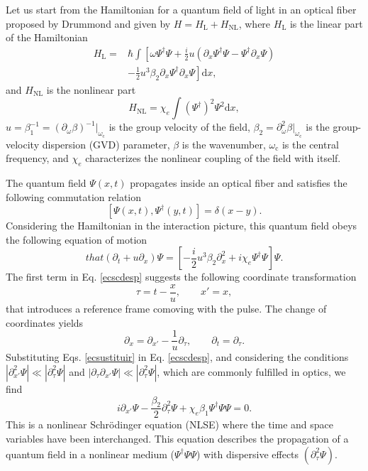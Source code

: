 \documentclass[aps,pra,reprint,amsmath,amssymb,showpacs,groupedaddress,floatfix]{revtex4-1}
\begin{document}
Let us start from the Hamiltonian for a quantum field of light in an optical fiber proposed by Drummond \cite{drummond1990,drummond2014quantum} and given by $H=H_\text{L}+H_\text{NL}$, where $H_\text{L}$ is the linear part of the Hamiltonian
\begin{align}
H_\text{L}=&\hbar \int  \left[\omega\Psi^{\dagger}\Psi
+\frac{i}{2}u\left(\partial_x\Psi^{\dagger}\Psi-\Psi^{\dagger}\partial_x\Psi\right)\right. \nonumber\\
&\left. -\frac{1}{2}u^3\beta_2\partial_x\Psi^{\dagger}\partial_x\Psi \right] \text{d}x,
\end{align}
and $H_\text{NL}$ is the nonlinear part
\begin{equation}
H_\text{NL}=\chi_e\int \left(\Psi^{\dagger}\right)^2\Psi^2 \text{d}x,
\end{equation}
$u=\beta_1^{-1}=(\partial_{\omega}\beta)^{-1}|_{\omega_\text{c}}$ is the group velocity of the field, $\beta_2=\partial^2_\omega \beta|_{\omega_\text{c}}$ is the group-velocity dispersion (GVD) parameter, $\beta$ is the wavenumber, $\omega_\text{c}$ is the central frequency, and $\chi_e$ characterizes the nonlinear coupling of the field with itself.

The quantum field $\Psi(x,t)$ propagates inside an optical fiber and satisfies the following commutation relation
\begin{equation}\label{ec:conmutador}
[\Psi(x,t),\Psi^{\dagger}(y,t)]=\delta(x-y).
\end{equation}
Considering the Hamiltonian in the interaction picture, this quantum field obeys the following equation of motion
\begin{equation}\label{ecscdesp}that
(\partial_t+u\partial_x)\Psi=\left[-\frac{i}{2}u^3\beta_2\partial_x^2+i\chi_e\Psi^{\dagger}\Psi\right]\Psi.
\end{equation} 
The first term in Eq. \eqref{ecscdesp} suggests the following coordinate transformation
\begin{equation}\label{trans1}
\tau=t-\frac{x}{u},\qquad x'=x,
\end{equation}
that introduces a reference frame comoving with the pulse. The change of coordinates yields
\begin{equation}\label{ecsustituir}
\partial_x=\partial_{x'}- \frac{1}{u}\partial_{\tau}, \qquad \partial_{t}=\partial_{\tau}.
\end{equation}
Substituting Eqs. \eqref{ecsustituir} in Eq. \eqref{ecscdesp}, and considering the conditions $|\partial_{x'}^2\Psi|\ll |\partial_{\tau}^2\Psi|$ and $|\partial_{\tau}\partial_{x'}\Psi|\ll |\partial_{\tau}^2\Psi|$, which are commonly fulfilled in optics\cite{drummond2014quantum}, we find
\begin{equation}\label{ec:NLST}
i\partial_{x'}\Psi-\frac{\beta_2}{2}\partial_{\tau}^2\Psi+\chi_e\beta_1\Psi^{\dagger}\Psi\Psi=0.
\end{equation}
This is a nonlinear Schr\"odinger equation (NLSE) where the time and space variables have been interchanged. This equation describes the propagation of a quantum field in a nonlinear medium ($\Psi^{\dagger}\Psi\Psi$) with dispersive effects $(\partial_{\tau}^2\Psi)$.
\end{document}
